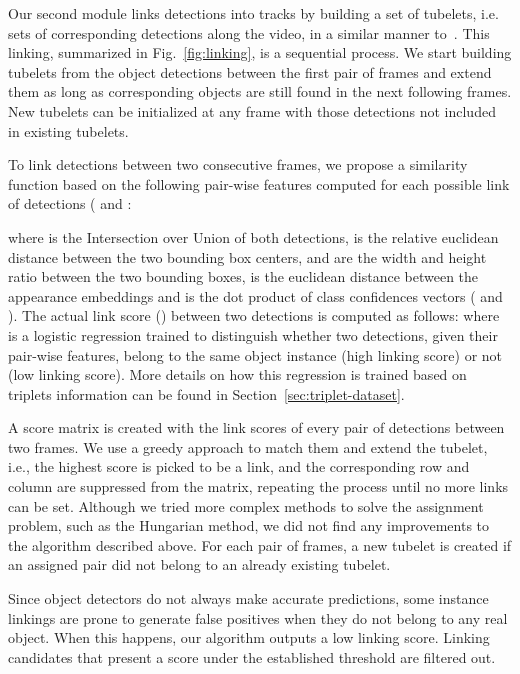 \documentclass[letterpaper, 10 pt, conference]{ieeeconf}
\begin{document}
Our second module links detections into tracks by building a set of tubelets, i.e. sets of corresponding detections along the video, in a similar manner to~\cite{SEQ-BBOX:VISIGRAPP}. This linking, summarized in Fig.~\ref{fig:linking}, is a sequential process. 
We start building tubelets from the object detections between the first pair of frames and extend them as long as corresponding objects are still found in the next following frames. New tubelets can be initialized at any frame with those detections not included in existing tubelets.


To link detections between two consecutive frames, we propose a similarity function based on the following pair-wise features computed for each possible link of detections ( and :

\noindent where  is the Intersection over Union of both detections,  is the relative euclidean distance between the two bounding box centers, 
 and  are the width and height ratio between the two bounding boxes,  is the euclidean distance between the appearance embeddings and  is the dot product of class confidences vectors ( and ). 
The actual link score () between two detections is computed as follows: 
\noindent where  is a logistic regression trained to distinguish whether two detections, given their pair-wise features, belong to the same object instance (high linking score) or not (low linking score). More details on how this regression is trained based on triplets information can be found in Section~\ref{sec:triplet-dataset}.


A score matrix is created with the link scores of every pair of detections between two frames. We use a greedy approach to match them and extend the tubelet, i.e., the highest score is picked to be a link, and the corresponding row and column are suppressed from the matrix, repeating the process until no more links can be set. 
Although we tried more complex methods to solve the assignment problem, such as the Hungarian method, 
we did not find any improvements to the algorithm described above.
For each pair of frames, a new tubelet is created if an assigned pair did not belong to an already existing tubelet. 

















Since object detectors do not always make accurate predictions, some instance linkings are prone to generate false positives when they do not belong to any real object. When this happens, our algorithm outputs a low linking score. Linking candidates that present a score under the established threshold are filtered out.
\end{document}
